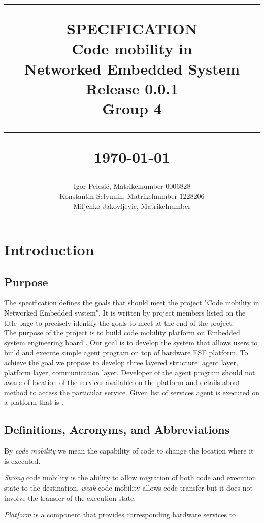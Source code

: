 \documentclass{scrreprt}
\title{%
\flushright
\rule{16cm}{2pt}\vskip1cm
\Huge{SPECIFICATION}\\
\vspace{1cm}
Code mobility in \\Networked Embedded System\\
\vspace{1cm}
\LARGE{Release 0.0.1\\}
\vspace{1cm}
Group 4\\
\vspace{1cm}
\author{Igor Pelesi\'c, Matrikelnumber 0006828\\
Konstantin Selyunin, Matrikelnumber 1228206\\
Miljenko Jakovljevic, Matrikelnumber }
\vfill
\rule{16cm}{2pt}\vskip1cm
\date{}
\today
}
\begin{document}
\maketitle
\tableofcontents
\renewcommand{\familydefault}{\sfdefault}
\clearpage
\chapter{Introduction}

	\section{Purpose}

The specification defines the goals that should meet the project "Code mobility in Networked Embedded system". It is written by project members listed on the title page to precisely identify the goals to meet at the end of the project.
\\
\noindent
The purpose of the project is to build code mobility platform on Embedded system engineering board \cite{Gallaher}. Our goal is to develop the system that allows users to build and execute simple agent program on top of  hardware ESE platform. To achieve the goal we propose to develop three layered structure: agent layer, platform layer, communication layer. Developer of the agent program should not aware of location of the services available on the platform and details about method to access the particular service. Given list of services agent is executed on a platform that is .


	\section{Definitions, Acronyms, and Abbreviations}

By \emph{code mobility} we mean the capability of code to change the location where it is executed.

\emph{Strong} code mobility is the ability to allow migration of both code and execution state to the destination, \emph{weak} code mobility allows code transfer but it does not involve the transfer of the execution state.

\emph{Platform} is a component that provides corresponding hardware services to 
\end{document}
